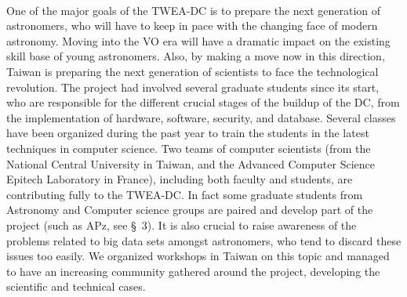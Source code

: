 \\
One of the major goals of the TWEA-DC is to prepare the next generation of astronomers, who will have to keep in pace with the changing face of modern astronomy. Moving into the VO era will have a dramatic impact on the existing skill base of young astronomers. Also, by making a move now in this direction, Taiwan is preparing the next generation of scientists to face the technological revolution. The project had involved several graduate students since its start, who are responsible for the different crucial stages of the buildup of the DC, from the implementation of hardware, software, security, and database. Several classes have been organized during the past year to train the students in the latest techniques in computer science. Two teams of computer scientists (from the National Central University in Taiwan, and the Advanced Computer Science Epitech Laboratory in France), including both faculty and students, are contributing fully to the TWEA-DC. In fact some graduate students from Astronomy and Computer science groups are paired and develop part of the project (such as APz, see \S~3). It is also crucial to raise awareness of the problems related to big data sets amongst astronomers, who tend to discard these issues too easily. We organized workshops in Taiwan on this topic and managed to have an increasing community gathered around the project, developing the scientific and technical cases.\\

